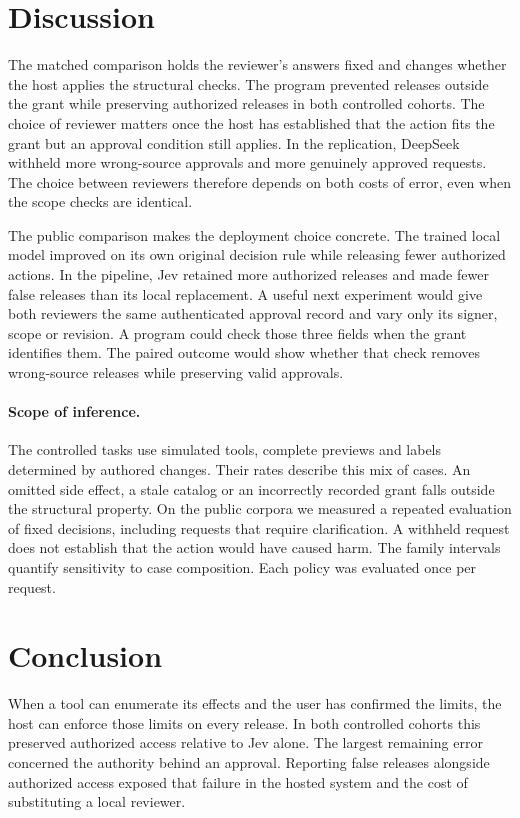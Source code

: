 \documentclass[10pt,letterpaper]{article}
\begin{document}

\FloatBarrier

\section{Discussion}
The matched comparison holds the reviewer's answers fixed and changes whether the host applies the structural checks. The program prevented releases outside the grant while preserving authorized releases in both controlled cohorts. The choice of reviewer matters once the host has established that the action fits the grant but an approval condition still applies. In the replication, DeepSeek withheld more wrong-source approvals and more genuinely approved requests. The choice between reviewers therefore depends on both costs of error, even when the scope checks are identical.

The public comparison makes the deployment choice concrete. The trained local model improved on its own original decision rule while releasing fewer authorized actions. In the pipeline, Jev retained more authorized releases and made fewer false releases than its local replacement. A useful next experiment would give both reviewers the same authenticated approval record and vary only its signer, scope or revision. A program could check those three fields when the grant identifies them. The paired outcome would show whether that check removes wrong-source releases while preserving valid approvals.

\paragraph{Scope of inference.} The controlled tasks use simulated tools, complete previews and labels determined by authored changes. Their rates describe this mix of cases. An omitted side effect, a stale catalog or an incorrectly recorded grant falls outside the structural property. On the public corpora we measured a repeated evaluation of fixed decisions, including requests that require clarification. A withheld request does not establish that the action would have caused harm. The family intervals quantify sensitivity to case composition. Each policy was evaluated once per request.

\section{Conclusion}
When a tool can enumerate its effects and the user has confirmed the limits, the host can enforce those limits on every release. In both controlled cohorts this preserved authorized access relative to Jev alone. The largest remaining error concerned the authority behind an approval. Reporting false releases alongside authorized access exposed that failure in the hosted system and the cost of substituting a local reviewer.
\end{document}
